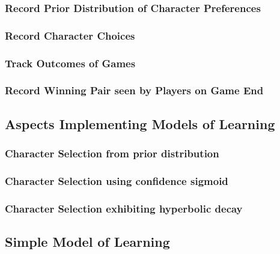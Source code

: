 \subsubsection{Record Prior Distribution of Character Preferences}

\subsubsection{Record Character Choices}

\subsubsection{Track Outcomes of Games}

\subsubsection{Record Winning Pair seen by Players on Game End}


\subsection{Aspects Implementing Models of Learning}

\subsubsection{Character Selection from prior distribution}

\subsubsection{Character Selection using confidence sigmoid}

\subsubsection{Character Selection exhibiting hyperbolic decay}




\subsection{Simple Model of Learning}\label{subsec:optimisation_with_aspects_basiclearningaspect}


